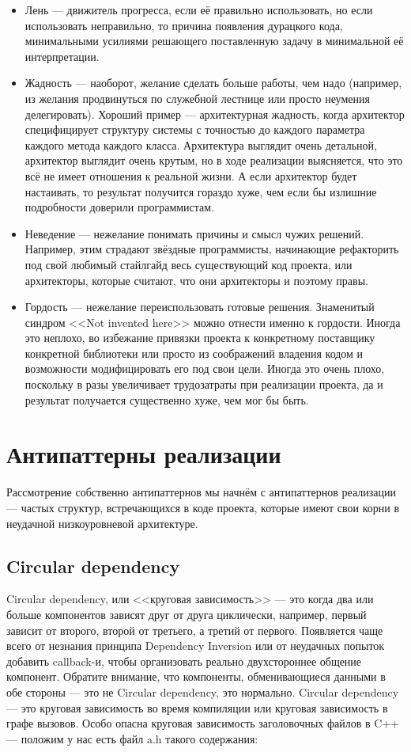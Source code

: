 \documentclass{../../text-style}
\begin{document}
\begin{itemize}
    \item Лень --- движитель прогресса, если её правильно использовать, но если использовать неправильно, то причина появления дурацкого кода, минимальными усилиями решающего поставленную задачу в минимальной её интерпретации.
    \item Жадность --- наоборот, желание сделать больше работы, чем надо (например, из желания продвинуться по служебной лестнице или просто неумения делегировать). Хороший пример --- архитектурная жадность, когда архитектор специфицирует структуру системы с точностью до каждого параметра каждого метода каждого класса. Архитектура выглядит очень детальной, архитектор выглядит очень крутым, но в ходе реализации выясняется, что это всё не имеет отношения к реальной жизни. А если архитектор будет настаивать, то результат получится гораздо хуже, чем если бы излишние подробности доверили программистам.
    \item Неведение --- нежелание понимать причины и смысл чужих решений. Например, этим страдают звёздные программисты, начинающие рефакторить под свой любимый стайлгайд весь существующий код проекта, или архитекторы, которые считают, что они архитекторы и поэтому правы.
    \item Гордость --- нежелание переиспользовать готовые решения. Знаменитый синдром <<Not invented here>> можно отнести именно к гордости. Иногда это неплохо, во избежание привязки проекта к конкретному поставщику конкретной библиотеки или просто из соображений владения кодом и возможности модифицировать его под свои цели. Иногда это очень плохо, поскольку в разы увеличивает трудозатраты при реализации проекта, да и результат получается существенно хуже, чем мог бы быть.
\end{itemize}

\section{Антипаттерны реализации}

Рассмотрение собственно антипаттернов мы начнём с антипаттернов реализации --- частых структур, встречающихся в коде проекта, которые имеют свои корни в неудачной низкоуровневой архитектуре.

\subsection{Circular dependency}

Circular dependency, или <<круговая зависимость>> --- это когда два или больше компонентов зависят друг от друга циклически, например, первый зависит от второго, второй от третьего, а третий от первого. Появляется чаще всего от незнания принципа Dependency Inversion или от неудачных попыток добавить callback-и, чтобы организовать реально двухстороннее общение компонент. Обратите внимание, что компоненты, обменивающиеся данными в обе стороны --- это не Circular dependency, это нормально. Circular dependency --- это круговая зависимость во время компиляции или круговая зависимость в графе вызовов. Особо опасна круговая зависимость заголовочных файлов в C++ --- положим у нас есть файл a.h такого содержания:
\end{document}
